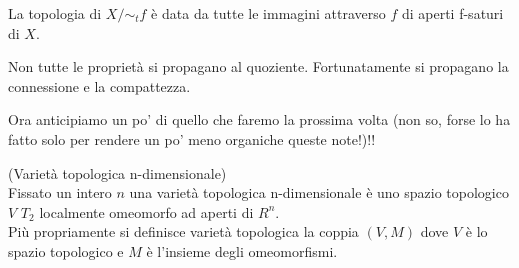 \begin{prop}
La topologia di $X/\sim_t f$ è data da tutte le immagini attraverso $f$ di aperti f-saturi di $X$.
\end{prop}

\begin{oss}
Non tutte le proprietà si propagano al quoziente. Fortunatamente si propagano la connessione e la compattezza.
\end{oss}





Ora anticipiamo un po' di quello che faremo la prossima volta (non so, forse lo ha fatto solo per rendere un po' meno organiche queste note!)!!



\begin{defn}
(Varietà topologica n-dimensionale)\\
Fissato un intero $n$ una varietà topologica n-dimensionale è uno spazio topologico $V$ $T_2$ localmente omeomorfo ad aperti di $R^n$.\\
Più propriamente si definisce varietà topologica la coppia $(V, M)$ dove $V$ è lo spazio topologico e $M$ è l'insieme degli omeomorfismi.\\ 
\end{defn}
